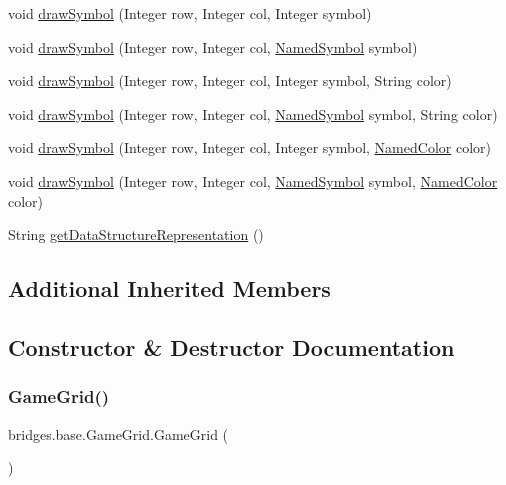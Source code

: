 \begin{DoxyCompactItemize}
\item 
void \hyperlink{classbridges_1_1base_1_1_game_grid_a8eee4918e2cbfc956a92a39252590114}{draw\+Symbol} (Integer row, Integer col, Integer symbol)
\item 
void \hyperlink{classbridges_1_1base_1_1_game_grid_a8e8f99d386149e9cd888dd9e6796e5e0}{draw\+Symbol} (Integer row, Integer col, \hyperlink{enumbridges_1_1base_1_1_named_symbol}{Named\+Symbol} symbol)
\item 
void \hyperlink{classbridges_1_1base_1_1_game_grid_a89a27cff9fd390f6d824b7e71534b256}{draw\+Symbol} (Integer row, Integer col, Integer symbol, String color)
\item 
void \hyperlink{classbridges_1_1base_1_1_game_grid_a998fd9e2a9a64e290c9edb01d49f324a}{draw\+Symbol} (Integer row, Integer col, \hyperlink{enumbridges_1_1base_1_1_named_symbol}{Named\+Symbol} symbol, String color)
\item 
void \hyperlink{classbridges_1_1base_1_1_game_grid_ad791794e65de113d96dbd173b34ae820}{draw\+Symbol} (Integer row, Integer col, Integer symbol, \hyperlink{enumbridges_1_1base_1_1_named_color}{Named\+Color} color)
\item 
void \hyperlink{classbridges_1_1base_1_1_game_grid_a778e5b036a18278c9e93e01faa19421c}{draw\+Symbol} (Integer row, Integer col, \hyperlink{enumbridges_1_1base_1_1_named_symbol}{Named\+Symbol} symbol, \hyperlink{enumbridges_1_1base_1_1_named_color}{Named\+Color} color)
\item 
String \hyperlink{classbridges_1_1base_1_1_game_grid_a3c72c7277f9c72ceff82fd063298541e}{get\+Data\+Structure\+Representation} ()
\end{DoxyCompactItemize}
\subsection*{Additional Inherited Members}


\subsection{Constructor \& Destructor Documentation}
\mbox{\label{classbridges_1_1base_1_1_game_grid_a0b5330e66b504eddc00617c5f1fa6240}} 
\subsubsection{\texorpdfstring{Game\+Grid()}{GameGrid()}\hspace{0.1cm}{\footnotesize\ttfamily [1/2]}}
{\footnotesize\ttfamily bridges.\+base.\+Game\+Grid.\+Game\+Grid (\begin{DoxyParamCaption}{ }\end{DoxyParamCaption})}

